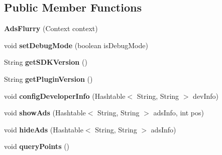 \subsection*{Public Member Functions}
\begin{DoxyCompactItemize}
\item 
\mbox{\label{classorg_1_1cocos2dx_1_1plugin_1_1AdsFlurry_ad884161a7881a7dd2bbe29e7b9f910f2}} 
{\bfseries Ads\+Flurry} (Context context)
\item 
\mbox{\label{classorg_1_1cocos2dx_1_1plugin_1_1AdsFlurry_abfa94420a661babed8a3b7d6bf91e891}} 
void {\bfseries set\+Debug\+Mode} (boolean is\+Debug\+Mode)
\item 
\mbox{\label{classorg_1_1cocos2dx_1_1plugin_1_1AdsFlurry_afb89d8fd3240a60eb87c0c3a10a2ac99}} 
String {\bfseries get\+S\+D\+K\+Version} ()
\item 
\mbox{\label{classorg_1_1cocos2dx_1_1plugin_1_1AdsFlurry_a6654bbd8ed147565c2dc2508ddeae5f2}} 
String {\bfseries get\+Plugin\+Version} ()
\item 
\mbox{\label{classorg_1_1cocos2dx_1_1plugin_1_1AdsFlurry_af5c9446f78e3e4b0944e954bedb0bbd9}} 
void {\bfseries config\+Developer\+Info} (Hashtable$<$ String, String $>$ dev\+Info)
\item 
\mbox{\label{classorg_1_1cocos2dx_1_1plugin_1_1AdsFlurry_a8e51379c5d9fbfd145b2a2658519f562}} 
void {\bfseries show\+Ads} (Hashtable$<$ String, String $>$ ads\+Info, int pos)
\item 
\mbox{\label{classorg_1_1cocos2dx_1_1plugin_1_1AdsFlurry_ab871b671fd2e9d95d2e8dfdedc123535}} 
void {\bfseries hide\+Ads} (Hashtable$<$ String, String $>$ ads\+Info)
\item 
\mbox{\label{classorg_1_1cocos2dx_1_1plugin_1_1AdsFlurry_a0d6c54e0300d601695a433db508985f7}} 
void {\bfseries query\+Points} ()
\item 

\end{DoxyCompactItemize}
